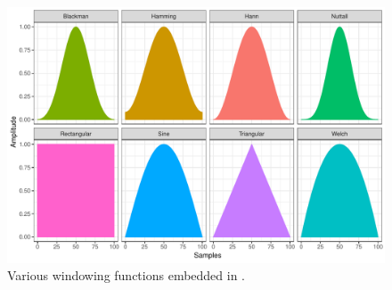 \documentclass[a4paper,9pt]{extarticle}
\begin{document}
\begin{figure}[!h]
  \centering
  \includegraphics[width=.9\linewidth]{fig/filters.pdf}
  \caption{Various windowing functions embedded in \smashpp.}
  \label{fig.filters}
\end{figure}
\end{document}
